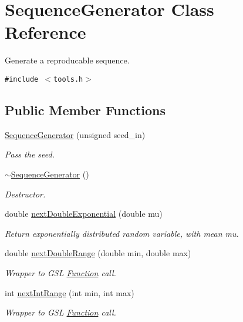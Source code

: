 \hypertarget{classSequenceGenerator}{
\section{SequenceGenerator Class Reference}
\label{classSequenceGenerator}
}
Generate a reproducable sequence.  


{\tt \#include $<$tools.h$>$}

\subsection*{Public Member Functions}
\begin{CompactItemize}
\item 
\hyperlink{classSequenceGenerator_0348a93ab1b1f0fdcc15f4ba08654395}{SequenceGenerator} (unsigned seed\_\-in)
\begin{CompactList}\small\item\em Pass the seed. \item\end{CompactList}\item 
\hyperlink{classSequenceGenerator_73b695e0f3353100e6476dbac4ab39a4}{$\sim$SequenceGenerator} ()
\begin{CompactList}\small\item\em Destructor. \item\end{CompactList}\item 
double \hyperlink{classSequenceGenerator_e5172bf7a72210a37724d3b51804e4c5}{nextDoubleExponential} (double mu)
\begin{CompactList}\small\item\em Return exponentially distributed random variable, with mean mu. \item\end{CompactList}\item 
double \hyperlink{classSequenceGenerator_15f18b2aeec1e2cab2b0c22acbc04202}{nextDoubleRange} (double min, double max)
\begin{CompactList}\small\item\em Wrapper to GSL \hyperlink{classFunction}{Function} call. \item\end{CompactList}\item 
int \hyperlink{classSequenceGenerator_31904303f64c5adcf91d924b41c71a80}{nextIntRange} (int min, int max)
\begin{CompactList}\small\item\em Wrapper to GSL \hyperlink{classFunction}{Function} call. \item\end{CompactList}\end{CompactItemize}

